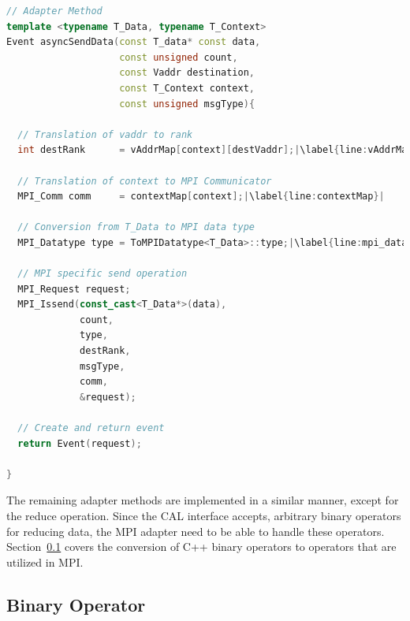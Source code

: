 \begin{lstlisting}[language=C++, breaklines=false, label={lst:adapter_send},escapechar=|]
// Adapter Method
template <typename T_Data, typename T_Context>      
Event asyncSendData(const T_data* const data, 
                    const unsigned count, 
                    const Vaddr destination, 
                    const T_Context context, 
                    const unsigned msgType){    

  // Translation of vaddr to rank
  int destRank      = vAddrMap[context][destVaddr];|\label{line:vAddrMap}|

  // Translation of context to MPI Communicator
  MPI_Comm comm     = contextMap[context];|\label{line:contextMap}|

  // Conversion from T_Data to MPI data type
  MPI_Datatype type = ToMPIDatatype<T_Data>::type;|\label{line:mpi_datatype}|

  // MPI specific send operation                                                                            
  MPI_Request request; 
  MPI_Issend(const_cast<T_Data*>(data), 
             count, 
             type,
             destRank, 
             msgType,
             comm,
             &request);

  // Create and return event
  return Event(request);                                                                                                       

}  
\end{lstlisting}

\noindent The remaining adapter methods are implemented in a similar
manner, except for the reduce operation. Since the CAL interface
accepts, arbitrary binary operators for reducing data, the MPI adapter
need to be able to handle these
operators. Section~\ref{sec:bin_operator} covers the conversion of C++
binary operators to operators that are utilized in MPI.

\subsection{Binary Operator}
\label{sec:bin_operator}

